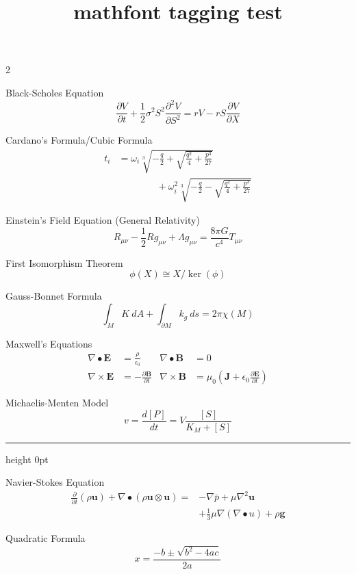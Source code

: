 \documentclass[12pt]{article}
\title{mathfont tagging test}
\begin{document}
\multicolsep=0pt\relax
\bigskip
\begin{multicols*}{2}

Black-Scholes Equation
\[
\frac{\partial V}{\partial t}+
  \frac12\sigma^2S^2\frac{\partial^2V}{\partial S^2}
  =rV-rS\frac{\partial V}{\partial X}
\]

\vfill

Cardano's Formula/Cubic Formula
\begin{align*}
t_i&=\omega_i\sqrt[3]{-\frac q2+\sqrt{\frac{q^2}4+\frac{p^3}{27}}}\\
  &\qquad\qquad{}+\omega_i^2\sqrt[3]{-\frac q2-\sqrt{\frac{q^2}4+\frac{p^3}{27}}}
\end{align*}

\vfill

Einstein's Field Equation (General Relativity)
\[
R_{\mu\nu}-\frac12Rg_{\mu\nu}+\Lambda g_{\mu\nu}=\frac{8\pi G}{c^4}T_{\mu\nu}
\]

\vfill

First Isomorphism Theorem
\[
\phi(X)\cong X/\ker(\phi)
\]

\vfill

Gauss-Bonnet Formula
\[
\int_MK\ dA+\int_{\partial M}k_g\ ds=2\pi\chi(M)
\]

\vfill

Maxwell's Equations
\begin{align*}
\nabla\bullet\mathbf E&=\frac\rho{\epsilon_0}&
\nabla\bullet\mathbf B&=0\\
\nabla\times\mathbf E&=-\frac{\partial\mathbf B}{\partial t}&
\nabla\times\mathbf B&=\mu_0\left(\mathbf J+
  \epsilon_0\frac{\partial\mathbf E}{\partial t}\right)
\end{align*}

\vfill

Michaelis-Menten Model
\bgroup
\belowdisplayskip=0pt\relax
\belowdisplayshortskip=0pt\relax
\[
v=\frac{d[P]}{dt}=V\frac{[S]}{K_M+[S]}
\]
\par\egroup
\hrule height 0pt
\columnbreak

Navier-Stokes Equation
\begin{align*}
\frac{\partial}{\partial t}(\rho\mathbf{u})+\nabla\bullet
  (\rho \mathbf{u}\otimes \mathbf{u})={}
  &{-}\nabla\bar p+\mu\nabla^2\mathbf{u}\\
  &+\frac13\mu\nabla(\nabla\bullet u)+
  \rho\mathbf{g}
\end{align*}

\vfill

Quadratic Formula
\[
x=\frac{-b\pm\sqrt{b^2-4ac}}{2a}
\]


\end{multicols*}
\end{document}
